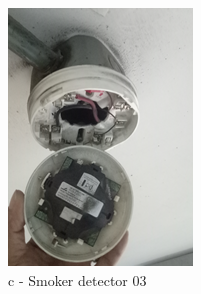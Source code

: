 \begin{figure}[h]
\begin{minipage}[b]{0.22\linewidth}
		\includegraphics[width=\textwidth]{figures/ch05_fdas_sd03}
		\caption*{c - Smoker detector 03}
	\end{minipage}
	\hspace{0.03cm}
	\begin{minipage}[b]{0.22\linewidth}
		\centering

\end{minipage}
\end{figure}
